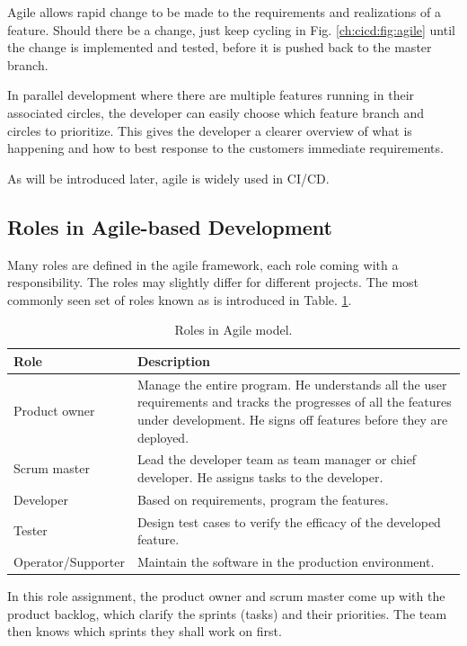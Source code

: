 Agile allows rapid change to be made to the requirements and realizations of a feature. Should there be a change, just keep cycling in Fig. \ref{ch:cicd:fig:agile} until the change is implemented and tested, before it is pushed back to the master branch.

In parallel development where there are multiple features running in their associated circles, the developer can easily choose which feature branch and circles to prioritize. This gives the developer a clearer overview of what is happening and how to best response to the customers immediate requirements.

As will be introduced later, agile is widely used in CI/CD.

\subsection{Roles in Agile-based Development}

Many roles are defined in the agile framework, each role coming with a responsibility. The roles may slightly differ for different projects. The most commonly seen set of roles known as  is introduced in Table. \ref{ch:cicd:tab:agilerole}.
\begin{table}[!htb]
	\centering
	\caption{Roles in Agile model.} \label{ch:cicd:tab:agilerole}
	\begin{tabularx}{\textwidth}{lX}
		\hline
		Role & Description \\
		\hline
		Product owner & Manage the entire program. He understands all the user requirements and tracks the progresses of all the features under development. He signs off features before they are deployed. \\ \hdashline
		Scrum master & Lead the developer team as team manager or chief developer. He assigns tasks to the developer. \\ \hdashline
		Developer & Based on requirements, program the features. \\ \hdashline
		Tester & Design test cases to verify the efficacy of the developed feature. \\ \hdashline
		Operator/Supporter & Maintain the software in the production environment. \\
		\hline
	\end{tabularx}
\end{table}

In this role assignment, the product owner and scrum master come up with the product backlog, which clarify the sprints (tasks) and their priorities. The team then knows which sprints they shall work on first.

